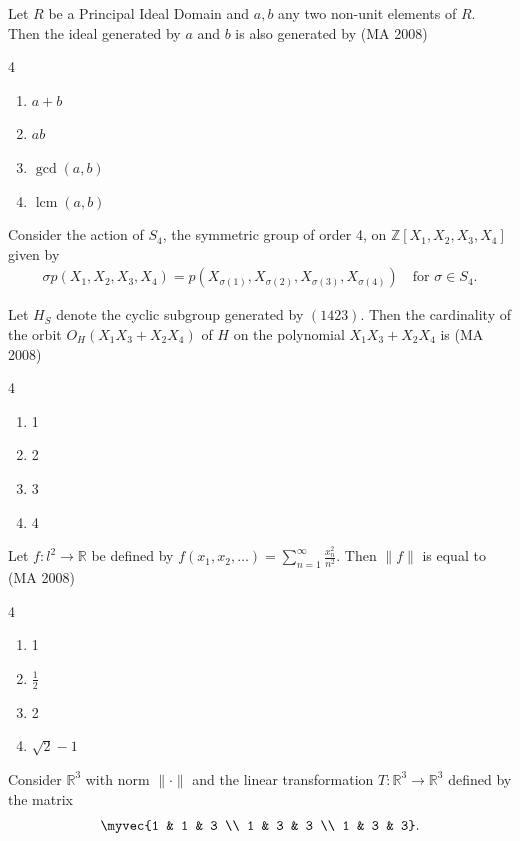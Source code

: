\item
Let $R$ be a Principal Ideal Domain and $a, b$ any two non-unit elements of $R$. Then the ideal generated by $a$ and $b$ is also generated by
\hfill (MA 2008)
\begin{multicols}{4}
\begin{enumerate}
    \item $a + b$
    \item $ab$
    \item $\gcd(a, b)$
    \item $\operatorname{lcm}(a, b)$
\end{enumerate}
\end{multicols}

\item
Consider the action of $S_4$, the symmetric group of order 4, on $\mathbb{Z}[X_1,X_2,X_3,X_4]$ given by
\begin{align}
    \sigma p(X_1,X_2,X_3,X_4) = p(X_{\sigma(1)}, X_{\sigma(2)}, X_{\sigma(3)}, X_{\sigma(4)}) \quad \text{for } \sigma \in S_4.
\end{align}

Let $H_S$ denote the cyclic subgroup generated by $(1423)$. Then the cardinality of the orbit $O_H(X_1X_3 + X_2X_4)$ of $H$ on the polynomial $X_1X_3 + X_2X_4$ is
\hfill (MA 2008)
\begin{multicols}{4}
\begin{enumerate}
    \item 1
    \item 2
    \item 3
    \item 4
\end{enumerate}
\end{multicols}

\item
Let $f: l^2 \to \mathbb{R}$ be defined by $f(x_1,x_2,\ldots) = \sum_{n=1}^\infty \frac{x_n^2}{n^2}$. Then $\| f \|$ is equal to
\hfill (MA 2008)
\begin{multicols}{4}
\begin{enumerate}
    \item 1
    \item $\frac{1}{2}$
    \item 2
    \item $\sqrt{2} - 1$
\end{enumerate}
\end{multicols}

\item
Consider $\mathbb{R}^3$ with norm $\|\cdot\|$ and the linear transformation $T : \mathbb{R}^3 \to \mathbb{R}^3$ defined by the matrix
\begin{align}
    \myvec{1 & 1 & 3 \\ 1 & 3 & 3 \\ 1 & 3 & 3}.
\end{align}

